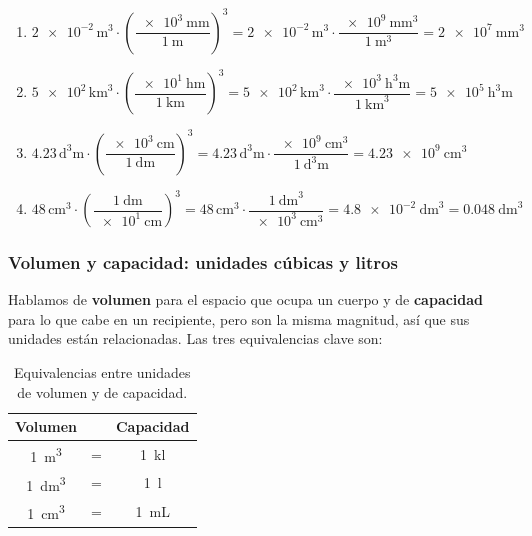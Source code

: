 \begin{exercise}
\begin{solu}
\begin{enumerate}[label=\alph*)]
            \item \(\num{2e-2}\,\unit{\cubic\m} \cdot \left(\dfrac{\qty{e3}{\mm}}{\qty{1}{\m}}\right)^{3} = \num{2e-2}\,\unit{\cubic\m} \cdot \dfrac{\qty{e9}{\cubic\mm}}{\qty{1}{\cubic\m}} = \qty{2e7}{\cubic\mm}\)
            \item \(\num{5e2}\,\unit{\cubic\km} \cdot \left(\dfrac{\qty{e1}{\hecto\m}}{\qty{1}{\km}}\right)^{3} = \num{5e2}\,\unit{\cubic\km} \cdot \dfrac{\qty{e3}{\cubic\hecto\m}}{\qty{1}{\cubic\km}} = \qty{5e5}{\cubic\hecto\m}\)
            \item \(\num{4.23}\,\unit{\cubic\deca\m} \cdot \left(\dfrac{\qty{e3}{\cm}}{\qty{1}{\deca\m}}\right)^{3} = \num{4.23}\,\unit{\cubic\deca\m} \cdot \dfrac{\qty{e9}{\cubic\cm}}{\qty{1}{\cubic\deca\m}} = \qty{4.23e9}{\cubic\cm}\)
            \item \(\num{48}\,\unit{\cubic\cm} \cdot \left(\dfrac{\qty{1}{\dm}}{\qty{e1}{\cm}}\right)^{3} = \num{48}\,\unit{\cubic\cm} \cdot \dfrac{\qty{1}{\cubic\dm}}{\qty{e3}{\cubic\cm}} = \qty{4.8e-2}{\cubic\dm} = \qty{0.048}{\cubic\dm}\)
        \end{enumerate}
    \end{solu}
\end{exercise}


\subsubsection{Volumen y capacidad: unidades cúbicas y litros}

Hablamos de \textbf{volumen} para el espacio que ocupa un cuerpo y de \textbf{capacidad} para lo que cabe en un recipiente, pero son la misma magnitud, así que sus unidades están relacionadas. Las tres equivalencias clave son:

\begin{table}[H]
    \centering
    \renewcommand{\arraystretch}{1.4}
    \begin{tabular}{ccc}
        \toprule
        \textbf{Volumen} & & \textbf{Capacidad} \\
        \midrule
        \qty{1}{\cubic\m} & = & \qty{1}{\kilo\litre} \\
        \qty{1}{\cubic\dm} & = & \qty{1}{\litre} \\
        \qty{1}{\cubic\cm} & = & \qty{1}{\mL} \\
        \bottomrule
    \end{tabular}
    \caption{Equivalencias entre unidades de volumen y de capacidad.}
    \label{tab:u1_volume_capacity}
\end{table}

